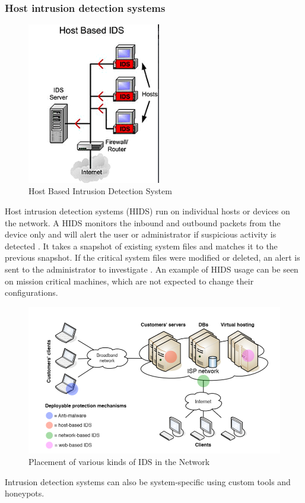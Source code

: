 \documentclass[12pt]{article}
\theoremstyle{definition}
\begin{document}
			\subsubsection{Host intrusion detection systems}
			\begin{figure}[!h]
				\centering
				\includegraphics[height=200pt]{pictures/host-ids.png}
				\caption{Host Based Intrusion Detection System\cite{AlEroud2017}}
				\label{fig:host-ids}
			\end{figure}
			Host intrusion detection systems (HIDS) run on individual hosts or devices on the network. A HIDS monitors the inbound and outbound packets from the device only and will alert the user or administrator if suspicious activity is detected \cite{SumaiyaThaseen2016}. It takes a snapshot of existing system files and matches it to the previous snapshot. If the critical system files were modified or deleted, an alert is sent to the administrator to investigate \cite{Vijai2016}. An example of HIDS usage can be seen on mission critical machines, which are not expected to change their configurations.
			\begin{figure}
				\centering
				\includegraphics[width=400pt]{pictures/applications-of-ids.png}
				\caption{Placement of various kinds of IDS in the Network \cite{AlEroud2017}}
				\label{fig:apps-of-ids}
			\end{figure}
			Intrusion detection systems can also be system-specific using custom tools and honeypots.	
			
\end{document}
